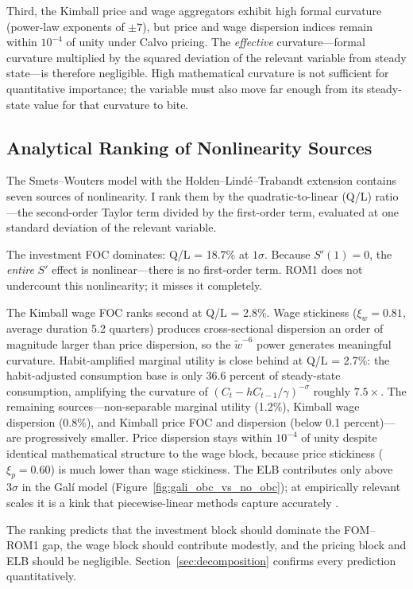 \documentclass[12pt]{article}
\theoremstyle{plain}
\theoremstyle{definition}
\theoremstyle{remark}
\begin{document}
Third, the Kimball price and wage aggregators exhibit high formal curvature (power-law exponents of $\pm 7$), but price and wage dispersion indices remain within $10^{-4}$ of unity under Calvo pricing. The \emph{effective} curvature---formal curvature multiplied by the squared deviation of the relevant variable from steady state---is therefore negligible. High mathematical curvature is not sufficient for quantitative importance; the variable must also move far enough from its steady-state value for that curvature to bite.

\subsection{Analytical Ranking of Nonlinearity Sources}

The Smets--Wouters model with the Holden--Lind\'e--Trabandt extension contains seven sources of nonlinearity. I rank them by the quadratic-to-linear (Q/L) ratio---the second-order Taylor term divided by the first-order term, evaluated at one standard deviation of the relevant variable.

The investment FOC dominates: Q/L = 18.7\% at $1\sigma$. Because $S'(1) = 0$, the \emph{entire} $S'$ effect is nonlinear---there is no first-order term. ROM1 does not undercount this nonlinearity; it misses it completely.

The Kimball wage FOC ranks second at Q/L = 2.8\%. Wage stickiness ($\xi_w = 0.81$, average duration 5.2 quarters) produces cross-sectional dispersion an order of magnitude larger than price dispersion, so the $\tilde{w}^{-6}$ power generates meaningful curvature. Habit-amplified marginal utility is close behind at Q/L = 2.7\%: the habit-adjusted consumption base is only 36.6 percent of steady-state consumption, amplifying the curvature of $(C_t - hC_{t-1}/\gamma)^{-\sigma}$ roughly $7.5\times$. The remaining sources---non-separable marginal utility (1.2\%), Kimball wage dispersion (0.8\%), and Kimball price FOC and dispersion (below 0.1 percent)---are progressively smaller. Price dispersion stays within $10^{-4}$ of unity despite identical mathematical structure to the wage block, because price stickiness ($\xi_p = 0.60$) is much lower than wage stickiness. The ELB contributes only above $3\sigma$ in the Gal\'i model (Figure~\ref{fig:gali_obc_vs_no_obc}); at empirically relevant scales it is a kink that piecewise-linear methods capture accurately \citep{guerrieri2015occbin}.

The ranking predicts that the investment block should dominate the FOM--ROM1 gap, the wage block should contribute modestly, and the pricing block and ELB should be negligible. Section~\ref{sec:decomposition} confirms every prediction quantitatively.
\end{document}
